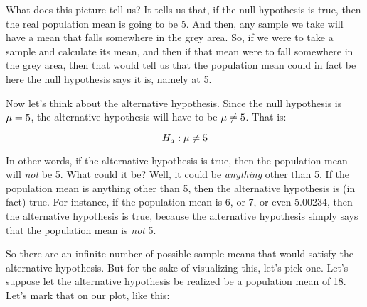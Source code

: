 \documentclass[../../../main.tex]{subfiles}
\begin{document}
\noindent
What does this picture tell us? It tells us that, if the null hypothesis is true, then the real population mean is going to be 5. And then, any sample we take will have a mean that falls somewhere in the grey area. So, if we were to take a sample and calculate its mean, and then if that mean were to fall somewhere in the grey area, then that would tell us that the population mean could in fact be here the null hypothesis says it is, namely at 5.

Now let's think about the alternative hypothesis. Since the null hypothesis is $\mu = 5$, the alternative hypothesis will have to be $\mu \not = 5$. That is:

\begin{equation*}
  \AltHyp/: \populationmean \not = 5
\end{equation*}

\noindent
In other words, if the alternative hypothesis is true, then the population mean will \emph{not} be 5. What could it be? Well, it could be \emph{anything} other than 5. If the population mean is anything other than 5, then the alternative hypothesis is (in fact) true. For instance, if the population mean is 6, or 7, or even 5.00234, then the alternative hypothesis is true, because the alternative hypothesis simply says that the population mean is \emph{not} 5.

So there are an infinite number of possible sample means that would satisfy the alternative hypothesis. But for the sake of visualizing this, let's pick one. Let's suppose let the alternative hypothesis be realized be a population mean of 18. Let's mark that on our plot, like this:

\begin{center}
\end{center}
\end{document}
